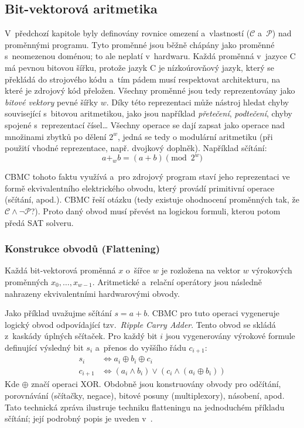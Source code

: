 \documentclass[a4paper, 11pt]{article}
\begin{document}
\subsection{Bit-vektorová aritmetika}\label{sec:CBMC_Desc_BitVectorArithmetics}

V~předchozí kapitole byly definovány rovnice omezení a~vlastností ($\mathcal{C}$ a~$\mathcal{P}$) nad proměnnými programu.
Tyto proměnné jsou běžně chápány jako proměnné s~neomezenou doménou; to ale neplatí v~hardwaru.
Každá proměnná v~jazyce C má pevnou bitovou šířku, protože jazyk C je nízkoúrovňový jazyk, který se překládá do strojového kódu a~tím pádem musí respektovat architekturu, na které je zdrojový kód přeložen.
Všechny proměnné jsou tedy reprezentovány jako \emph{bitové vektory} pevné šířky $w$.
Díky této reprezentaci může nástroj hledat chyby související s~bitovou aritmetikou, jako jsou například \emph{přetečení}, \emph{podtečení}, chyby spojené s~reprezentací čísel\dots
Všechny operace se dají zapsat jako operace nad množinami zbytků po dělení $2^w$, jedná se tedy o modulární aritmetiku (při použití vhodné reprezentace, např. dvojkový doplněk).
Například sčítání:
\[
    a +_w b = (a + b) \pmod{2^w}
\]

CBMC tohoto faktu využívá a~pro zdrojový program staví jeho reprezentaci ve formě ekvivalentního elektrického obvodu, který provádí primitivní operace (sčítání, apod.).
CBMC řeší otázku  (tedy existuje ohodnocení proměnných tak, že $\mathcal{C} \land \neg \mathcal{P}$?).
Proto daný obvod musí převést na logickou formuli, kterou potom předá SAT solveru.

\subsubsection{Konstrukce obvodů (Flattening)}
Každá bit-vektorová proměnná $x$ o~šířce $w$ je rozložena na vektor $w$ výrokových proměnných $x_0, \dots, x_{w-1}$.
Aritmetické a~relační operátory jsou následně nahrazeny ekvivalentními hardwarovými obvody.

Jako příklad uvažujme sčítání $s = a + b$.
CBMC pro tuto operaci vygeneruje logický obvod odpovídající tzv.~\emph{Ripple Carry Adder}.
Tento obvod se skládá z~kaskády úplných sčítaček.
Pro každý bit $i$ jsou vygenerovány výrokové formule definující výsledný bit $s_i$ a~přenos do vyššího řádu $c_{i+1}$:
\begin{align*}
    s_i     & \iff a_i \oplus b_i \oplus c_i                         \\
    c_{i+1} & \iff (a_i \land b_i) \lor (c_i \land (a_i \oplus b_i))
\end{align*}
Kde $\oplus$ značí operaci XOR.
Obdobně jsou konstruovány obvody pro odčítání, porovnávání (sčítačky, negace), bitové posuny (multiplexory), násobení, apod.
Tato technická zpráva ilustruje techniku flatteningu na jednoduchém příkladu sčítání; její podrobný popis je uveden v~\cite[kap.~6.2]{kroening2016decision}.
\end{document}

